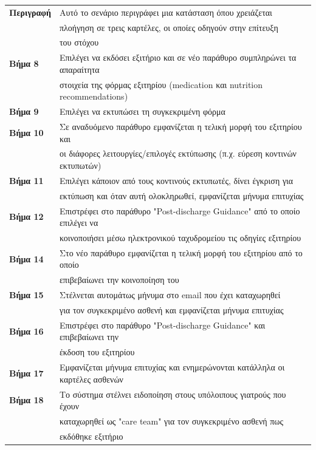 \documentclass{article}
\newcommand\T{\rule{0pt}{2.6ex}}       %
\newcommand\B{\rule[-1.2ex]{0pt}{0pt}}
\begin{document}
 \begin{center}
     \begin{tabular}{|l|l|}
     \hline
      \textbf{Περιγραφή} & Αυτό το σενάριο περιγράφει μια κατάσταση όπου χρειάζεται \T \\& πλοήγηση σε τρεις καρτέλες, οι οποίες οδηγούν στην επίτευξη \\& του στόχου \B \\ 
      \hline
      \textbf{Βήμα 8} & Επιλέγει να εκδόσει εξιτήριο και σε νέο παράθυρο συμπληρώνει τα απαραίτητα \T \\& στοιχεία της φόρμας εξιτηρίου (medication και nutrition recommendations) \B \\
      \hline
      \textbf{Βήμα 9} & Επιλέγει να εκτυπώσει τη συγκεκριμένη φόρμα \T\B \\
      \hline
      \textbf{Βήμα 10} & Σε αναδυόμενο παράθυρο εμφανίζεται η τελική μορφή του εξιτηρίου και \T \\& οι διάφορες λειτουργίες/επιλογές εκτύπωσης (π.χ. εύρεση κοντινών εκτυπωτών) \B \\
      \hline
      \textbf{Βήμα 11} & Επιλέγει κάποιον από τους κοντινούς εκτυπωτές, δίνει έγκριση για \T \\& εκτύπωση και όταν αυτή ολοκληρωθεί, εμφανίζεται μήνυμα επιτυχίας \B \\
      \hline
      \textbf{Βήμα 12} & Επιστρέφει στο παράθυρο "Post-discharge Guidance" από το οποίο επιλέγει να \T \\& κοινοποιήσει μέσω ηλεκτρονικού ταχυδρομείου τις οδηγίες εξιτηρίου \B \\
      \hline
      \textbf{Βήμα 14} & Στο νέο παράθυρο εμφανίζεται η τελική μορφή του εξιτηρίου από το οποίο \T\\&επιβεβαίωνει την κοινοποίηση του \B \\
      \hline
      \textbf{Βήμα 15} & Στέλνεται αυτομάτως μήνυμα στο email που έχει καταχωρηθεί \T \\& για τον συγκεκριμένο ασθενή και εμφανίζεται μήνυμα επιτυχίας \B \\
      \hline
      \textbf{Βήμα 16} & Επιστρέφει στο παράθυρο "Post-discharge Guidance" και επιβεβαίωνει την \T \\&  έκδοση του εξιτηρίου  \B \\   
      \hline
      \textbf{Βήμα 17} & Εμφανίζεται μήνυμα επιτυχίας και ενημερώνονται κατάλληλα οι καρτέλες ασθενών  \T \B \\      
      \hline
      \textbf{Βήμα 18} & Το σύστημα στέλνει ειδοποίηση στους υπόλοιπους γιατρούς που έχουν \T \\& καταχωρηθεί ως "care team" για τον συγκεκριμένο ασθενή πως \\& εκδόθηκε εξιτήριο \B \\
      \hline
     \end{tabular}
 \end{center}
 
\end{document}
